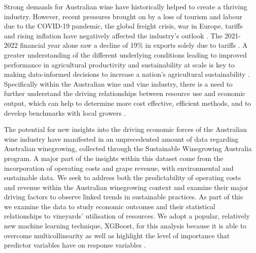 \documentclass[review,12pt,authoryear]{elsarticle}
\begin{document}
\begin{linenumbers}
Strong demands for Australian wine have historically helped to create a thriving industry. However, recent pressures brought on by a loss of tourism and labour due to the COVID-19 pandemic, the global freight crisis, war in Europe, tariffs and rising inflation have negatively affected the industry's outlook \citep{wineaustraliaNationalVintageReport2021,australiaAustralianWineProduction2021}. The 2021-2022 financial year alone saw a decline of 19\% in exports solely due to tariffs \citep{wineaustraliaNationalVintageReport2022}. A greater understanding of the different underlying conditions leading to improved performance in agricultural productivity and sustainability at scale is key to making data-informed decisions to increase a nation's agricultural sustainability \citep{oecdInnovationProductivitySustainability2019}. Specifically within the Australian wine and vine industry, there is a need to further understand the driving relationships between resource use and economic output, which can help to determine more cost effective, efficient methods, and to develop benchmarks with local growers \citep{lukemanciniUnderstandingAustralianWine2020}.
\par
The potential for new insights into the driving economic forces of the Australian wine industry have manifested in an unprecedented amount of data regarding Australian winegrowing, collected through the Sustainable Winegrowing Australia program. A major part of the insights within this dataset come from the incorporation of operating costs and grape revenue, with environmental and sustainable data. We seek to address both the predictability of operating costs and revenue within the Australian winegrowing context and examine their major driving factors to observe linked trends in sustainable practices. As part of this we examine the data to study economic outcomes and their statistical relationships to vineyards' utilisation of resources. We adopt a popular, relatively new machine learning technique, XGBoost, for this analysis because it is able to overcome multicollinearity as well as highlight the level of importance that predictor variables have on response variables \citep{chenXGBoostScalableTree2016}.
\par

\end{linenumbers}
\end{document}

